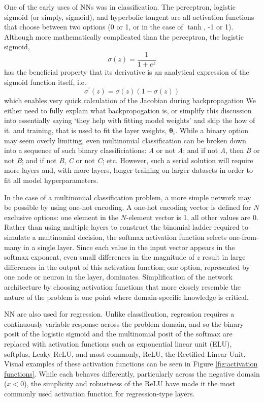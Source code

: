 One of the early uses of NNs was in classification. The perceptron, logistic sigmoid (or simply, sigmoid), and hyperbolic tangent are all activation functions that choose between two options (0 or 1, or in the case of $\tanh$, -1 or 1). Although more mathematically complicated than the perceptron, the logistic sigmoid,
\begin{equation}
	\sigma(z) = \frac{1}{1 + e^z}
	\label{sigmaz}
\end{equation}
has the beneficial property that its derivative is an analytical expression of the sigmoid function itself, i.e.
\begin{equation}
	\sigma^\prime(z) = \sigma(z) \left( 1 - \sigma(z) \right)
	\label{sigmaprime}
\end{equation}
which enables very quick calculation of the Jacobian during backpropagation {\color{red} We either need to fully explain what backpropogation is, or simplify this discussion into essentially saying `they help with fitting model weights' and skip the how of it.} and training, that is used to fit the layer weights, $\boldsymbol \theta_i$. While a binary option may seem overly limiting, even multinomial classification can be broken down into a sequence of such binary classificiations: \textit{A} or not \textit{A}; and if not \textit{A}, then \textit{B} or not \textit{B}; and if not \textit{B}, \textit{C} or not \textit{C}; etc. However, such a serial solution will require more layers and, with more layers, longer training on larger datasets in order to fit all model hyperparameters.

In the case of a multinomial classification problem, a more simple network may be possible by using one-hot encoding. A one-hot encoding vector is defined for $N$ exclusive options: one element in the $N$-element vector is 1, all other values are 0. Rather than using multiple layers to construct the binomial ladder required to simulate a multinomial decision, the softmax activation function selects one-from-many in a single layer. Since each value in the input vector appears in the softmax exponent, even small differences in the magnitude of $z$ result in large differences in the output of this activation function; one option, represented by one node or neuron in the layer, dominates. Simplification of the network architecture by choosing activation functions that more closely resemble the nature of the problem is one point where domain-specific knowledge is critical.

NN are also used for regression. Unlike classification, regression requires a continuously variable response across the problem domain, and so the binary posit of the logistic sigmoid and the multinomial posit of the softmax are replaced with activation functions such as exponential linear unit (ELU), softplus, Leaky ReLU, and most commonly, ReLU, the Rectified Linear Unit. Visual examples of these activation functions can be seen in Figure \ref{fig:activation functions}. While each behaves differently, particularly across the negative domain ($x < 0$), the simplicity and robustness of the ReLU have made it the most commonly used activation function for regression-type layers.

